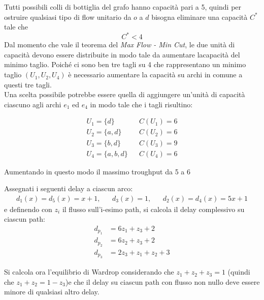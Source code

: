 \documentclass[11pt,largemargins]{homework}
\begin{document}
  \begin{alphaparts}
    \questionpart
     Tutti possibili colli di bottiglia del grafo hanno capacità pari a 5, quindi per ostruire qualsiasi tipo di flow unitario da \(o\) a \(d\) bisogna eliminare una capacità \(C^*\) tale che
    \begin{equation*}
      C^*<4
    \end{equation*}
    \questionpart
    Dal momento che vale il teorema del \textit{Max Flow - Min Cut}, le due unità di capacità devono essere distribuite in modo tale da aumentare lacapacità del minimo taglio. Poiché ci sono ben tre tagli su 4 che rappresentano un minimo taglio \((U_1, U_2, U_4)\) è necessario aumentare la capacità su archi in comune a questi tre tagli.\\
    Una scelta possibile potrebbe essere quella di aggiungere un'unità di capacità ciascuno agli archi \(e_1\) ed \(e_4\) in modo tale che i tagli risultino:
    
  \begin{align*}
    U_1 = \{d\}\  && C(U_1)=6 \\
    U_2 = \{a, d\} && C(U_2)=6 \\
    U_3 = \{b,d\} && C(U_3)=9 \\
    U_4 = \{a,b,d\} && C(U_4)=6
  \end{align*}

  Aumentando in questo modo il massimo troughput da 5 a 6

  \questionpart
  Assegnati i seguenti delay a ciascun arco:
  \begin{align*}
    d_1(x)=d_5(x)=x+1, && d_3(x)=1, && d_2(x)=d_4(x)=5x+1
  \end{align*}
  e definendo con \(z_i\) il flusso sull'i-esimo path, si calcola il delay complessivo su ciascun path:
  \begin{align*}
    d_{p_1}&=6z_1+z_3+2 \\
    d_{p_2}&=6z_2+z_3+2 \\
    d_{p_3}&=2z_3+z_1+z_2+3
  \end{align*}

  Si calcola ora l'equilibrio di Wardrop considerando che \(z_1+z_2+z_3=1\) (quindi che \(z_1+z_2=1-z_3\))e che il delay su ciascun path con flusso non nullo deve essere minore di qualsiasi altro delay.


\end{alphaparts}
\end{document}
